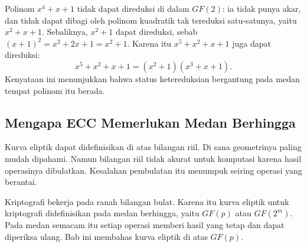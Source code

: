
Polinom $x^4 + x + 1$ tidak dapat direduksi di dalam $GF(2)$: ia tidak punya
akar, dan tidak dapat dibagi oleh polinom kuadratik tak tereduksi satu-satunya,
yaitu $x^2 + x + 1$. Sebaliknya, $x^2 + 1$ dapat direduksi, sebab
$(x + 1)^2 = x^2 + 2x + 1 = x^2 + 1$. Karena itu $x^5 + x^2 + x + 1$ juga dapat
direduksi:
\[
x^5 + x^2 + x + 1 = (x^2 + 1)(x^3 + x + 1) .
\]
Kenyataan ini menunjukkan bahwa status ketereduksian bergantung pada medan
tempat polinom itu berada.

\subsection{Mengapa ECC Memerlukan Medan Berhingga}
\label{subsec:mengapa-medan}

Kurva eliptik dapat didefinisikan di atas bilangan riil. Di sana geometrinya
paling mudah dipahami. Namun bilangan riil tidak akurat untuk komputasi karena
hasil operasinya dibulatkan. Kesalahan pembulatan itu menumpuk seiring operasi
yang berantai.

Kriptografi bekerja pada ranah bilangan bulat. Karena itu kurva eliptik untuk
kriptografi didefinisikan pada medan berhingga, yaitu $GF(p)$ atau $GF(2^m)$.
Pada medan semacam itu setiap operasi memberi hasil yang tetap dan dapat
diperiksa ulang. Bab ini membahas kurva eliptik di atas $GF(p)$.

